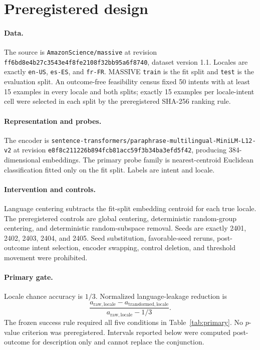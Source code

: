 \documentclass[10pt,twocolumn]{article}
\begin{document}
\section{Preregistered design}
\paragraph{Data.} The source is \texttt{AmazonScience/massive} at revision \nolinkurl{ff6bd8e4b27c3543e4f8fe2108f32bb95a6f8740}, dataset version 1.1. Locales are exactly \texttt{en-US}, \texttt{es-ES}, and \texttt{fr-FR}. MASSIVE \texttt{train} is the fit split and \texttt{test} is the evaluation split. An outcome-free feasibility census fixed 50 intents with at least 15 examples in every locale and both splits; exactly 15 examples per locale-intent cell were selected in each split by the preregistered SHA-256 ranking rule.

\paragraph{Representation and probes.} The encoder is \nolinkurl{sentence-transformers/paraphrase-multilingual-MiniLM-L12-v2} at revision \nolinkurl{e8f8c211226b894fcb81acc59f3b34ba3efd5f42}, producing 384-dimensional embeddings. The primary probe family is nearest-centroid Euclidean classification fitted only on the fit split. Labels are intent and locale.

\paragraph{Intervention and controls.} Language centering subtracts the fit-split embedding centroid for each true locale. The preregistered controls are global centering, deterministic random-group centering, and deterministic random-subspace removal. Seeds are exactly 2401, 2402, 2403, 2404, and 2405. Seed substitution, favorable-seed reruns, post-outcome intent selection, encoder swapping, control deletion, and threshold movement were prohibited.

\paragraph{Primary gate.} Locale chance accuracy is $1/3$. Normalized language-leakage reduction is
\[
\frac{a_{\mathrm{raw,locale}}-a_{\mathrm{transformed,locale}}}{a_{\mathrm{raw,locale}}-1/3}.
\]
The frozen success rule required all five conditions in Table~\ref{tab:primary}. No $p$-value criterion was preregistered. Intervals reported below were computed post-outcome for description only and cannot replace the conjunction.
\end{document}
